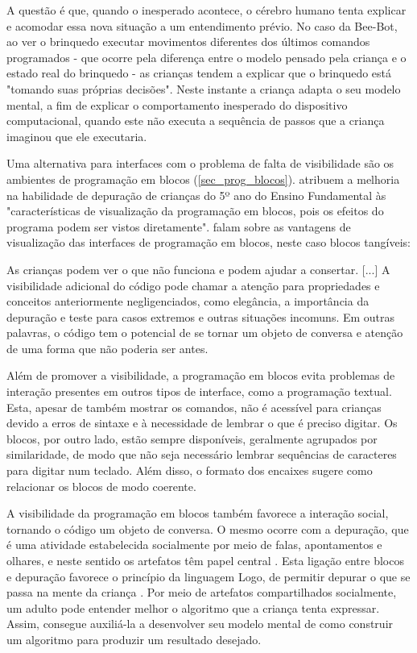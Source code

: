 A questão é que, quando o inesperado acontece, o cérebro humano tenta explicar e acomodar essa nova situação a um entendimento prévio. No caso da Bee-Bot, ao ver o brinquedo executar movimentos diferentes dos últimos comandos programados - que ocorre pela diferença entre o modelo pensado pela criança e o estado real do brinquedo - as crianças tendem a explicar que o brinquedo está "tomando suas próprias decisões". Neste instante a criança adapta o seu modelo mental, a fim de explicar o comportamento inesperado do dispositivo computacional, quando este não executa a sequência de passos que a criança imaginou que ele executaria.

Uma alternativa para interfaces com o problema de falta de visibilidade são os ambientes de programação em blocos (\autoref{sec_prog_blocos}).  atribuem a melhoria na habilidade de depuração de crianças do 5º ano do Ensino Fundamental às "características de visualização da programação em blocos, pois os efeitos do programa podem ser vistos diretamente".  falam sobre as vantagens de visualização das interfaces de programação em blocos, neste caso blocos tangíveis:

\begin{citacao}
As crianças podem ver o que não funciona e podem ajudar a consertar. [...] A visibilidade adicional do código pode chamar a atenção para propriedades e conceitos anteriormente negligenciados, como elegância, a importância da depuração e teste para casos extremos e outras situações incomuns. Em outras palavras, o código tem o potencial de se tornar um objeto de conversa e atenção de uma forma que não poderia ser antes. \cite[p.14, tradução nossa]{bers_coding_2019}
\end{citacao}

Além de promover a visibilidade, a programação em blocos evita problemas de interação presentes em outros tipos de interface, como a programação textual.
Esta, apesar de também mostrar os comandos, não é acessível para crianças devido a erros de sintaxe e à necessidade de lembrar o que é preciso digitar. Os blocos, por outro lado, estão sempre disponíveis, geralmente agrupados por similaridade, de modo que não seja necessário lembrar sequências de caracteres para digitar num teclado. Além disso, o formato dos encaixes sugere como relacionar os blocos de modo coerente.

A visibilidade da programação em blocos também favorece a interação social, tornando o código um objeto de conversa. O mesmo ocorre com a depuração, que é uma atividade estabelecida socialmente por meio de falas, apontamentos e olhares, e neste sentido os artefatos têm papel central \cite{heikkila_debugging_2018}. Esta ligação entre blocos e depuração favorece o princípio da linguagem Logo, de permitir depurar o que se passa na mente da criança \cite{solomon_history_2020}. Por meio de artefatos compartilhados socialmente, um adulto pode entender melhor o algoritmo que a criança tenta expressar. Assim, consegue auxiliá-la a desenvolver seu modelo mental de como construir um algoritmo para produzir um resultado desejado.

